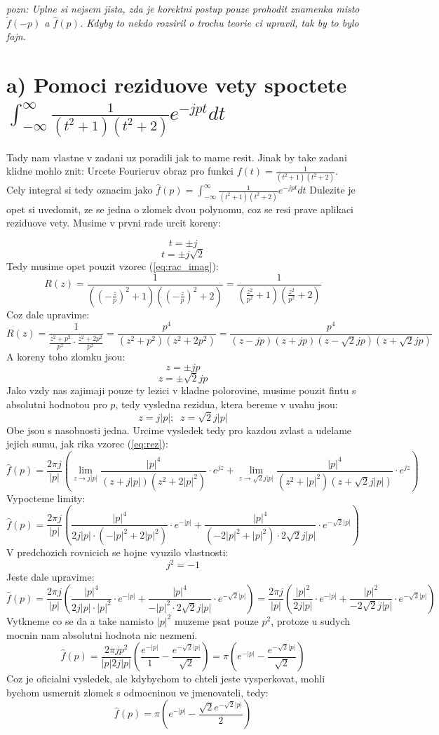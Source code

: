 \textit{pozn: Uplne si nejsem jista, zda je korektni postup pouze prohodit znamenka misto $\check{f}(-p)$ a $\hat{f}(p)$. Kdyby to nekdo rozsiril o trochu teorie ci upravil, tak by to bylo fajn.}

\newpage

\section{a) Pomoci reziduove vety spoctete $\int_{-\infty}^\infty \frac{1}{(t^2+1)(t^2+2)}e^{-jpt}dt$}

Tady nam vlastne v zadani uz poradili jak to mame resit. Jinak by take zadani klidne mohlo znit: Urcete Fourieruv obraz pro funkci $f(t)=\frac{1}{(t^2+1)(t^2+2)}$. Cely integral si tedy oznacim jako $\hat{f}(p) = \int_{-\infty}^\infty \frac{1}{(t^2+1)(t^2+2)}e^{-jpt}dt $ Dulezite je opet si uvedomit, ze se jedna o zlomek dvou polynomu, coz se resi prave aplikaci reziduove vety. Musime v prvni rade urcit koreny:

$$t=\pm j$$
$$t=\pm j\sqrt{2}$$
Tedy musime opet pouzit vzorec (\ref{eq:rac_imag}):
$$R(z)=\frac{1}{(\left( -\frac{z}{p}\right)^2+1)(\left( -\frac{z}{p}\right)^2+2)}=\frac{1}{\left(\frac{z^2}{p^2}+1\right) \left( \frac{z^2}{p^2}+2\right)}$$
Coz dale upravime:
$$R(z)=\frac{1}{\frac{z^2+p^2}{p^2}\cdot \frac{z^2+2p^2}{p^2}}=\frac{p^4}{(z^2+p^2)(z^2+2p^2)}=\frac{p^4}{(z-jp)(z+jp)(z-\sqrt{2}jp)(z+\sqrt{2}jp)}$$
A koreny toho zlomku jsou:
$$z=\pm jp$$
$$z = \pm \sqrt{2}jp$$
Jako vzdy nas zajimaji pouze ty lezici v kladne polorovine, musime pouzit fintu s absolutni hodnotou pro $p$, tedy vysledna rezidua, ktera bereme v uvahu jsou:
$$z=j|p| ; \; \; z=\sqrt{2}j|p|$$
Obe jsou s nasobnosti jedna. Urcime vysledek tedy pro kazdou zvlast a udelame jejich sumu, jak rika vzorec (\ref{eq:rez}):
$$\hat{f}(p)=\frac{2\pi j}{|p|}\left( \lim_{z \to j|p|} \frac{|p|^4}{(z+j|p|)(z^2+2|p|^2)}\cdot e^{jz} + \lim_{z \to \sqrt{2}j|p|} \frac{|p|^4}{(z^2+|p|^2)(z+\sqrt{2}j|p|)}\cdot e^{jz} \right)$$
Vypocteme limity:
$$\hat{f}(p)=\frac{2\pi j}{|p|}\left( \frac{|p|^4}{2j|p|\cdot (-|p|^2+2|p|^2)}\cdot e^{-|p|}+\frac{|p|^4}{(-2|p|^2+|p|^2)\cdot 2\sqrt{2}j|p|}\cdot e^{-\sqrt{2}|p|}\right)$$
V predchozich rovnicich se hojne vyuzilo vlastnosti:
$$j^2 = -1$$
Jeste dale upravime:
$$\hat{f}(p)=\frac{2\pi j}{|p|}\left( \frac{|p|^4}{2j|p|\cdot |p|^2}\cdot e^{-|p|}+\frac{|p|^4}{-|p|^2\cdot 2\sqrt{2}j|p|}\cdot e^{-\sqrt{2}|p|}\right)=\frac{2\pi j}{|p|}\left( \frac{|p|^2}{2j|p|}\cdot e^{-|p|}+\frac{|p|^2}{-2\sqrt{2}j|p|}\cdot e^{-\sqrt{2}|p|}\right)$$
Vytkneme co se da a take namisto $|p|^2$ muzeme psat pouze $p^2$, protoze u sudych mocnin nam absolutni hodnota nic nezmeni.
$$\hat{f}(p)=\frac{2\pi j p^2}{|p|2j|p|} \left( \frac{e^{-|p|}}{1} - \frac{e^{-\sqrt{2}|p|}}{\sqrt{2}}\right)=\pi \left(e^{-|p|} -  \frac{e^{-\sqrt{2}|p|}}{\sqrt{2}}\right)$$
Coz je oficialni vysledek, ale kdybychom to chteli jeste vysperkovat, mohli bychom usmernit zlomek s odmocninou ve jmenovateli, tedy:
$$\hat{f}(p) = \pi \left(e^{-|p|} -  \frac{\sqrt{2} e^{-\sqrt{2}|p|}}{2}\right)$$


